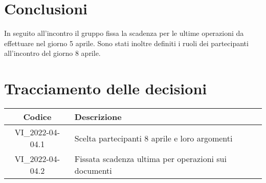     \section{Conclusioni}
        In seguito all'incontro il gruppo fissa la scadenza per le ultime operazioni da effettuare nel giorno 5 aprile. 
        Sono stati inoltre definiti i ruoli dei partecipanti all'incontro del giorno 8 aprile.
        \newpage
        
        \section*{Tracciamento delle decisioni}
        \renewcommand{\arraystretch}{1.8} %
        \begin{tabular}{ |c|l| }
            \hline
            \textbf{Codice} & \textbf{Descrizione} \\
            \hline
            VI\_2022-04-04.1 & Scelta partecipanti 8 aprile e loro argomenti \\ \hline
            VI\_2022-04-04.2 & Fissata scadenza ultima per operazioni sui documenti \\ \hline
        \end{tabular}
